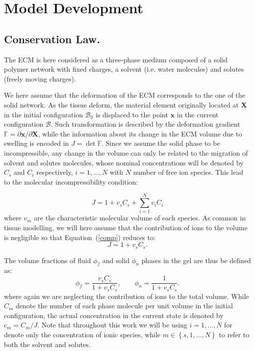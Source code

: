 \documentclass[runningheads]{llncs}
\newcommand{\F}{\ensuremath{\mathbb{F}}}
\begin{document}
\section{Model Development}
\subsection{Conservation Law.}

The ECM is here considered as a three-phase medium composed of a solid polymer network with fixed charges, a solvent (i.e. water molecules) and solutes (freely moving charges).

We here assume that the deformation of the ECM corresponds to the one of the solid network. As the tissue deform, the material element originally located at $\mathbf{X}$ in the initial configuration $\mathcal{B}_0$ is displaced to the point $\mathbf{x}$ in the current configuration $\mathcal{B}$. Such transformation is described by the deformation gradient $\F= \partial \mathbf{x}/\partial \mathbf{X}$, while the information about its change in the ECM volume due to swelling is encoded in $J= \det \F$. Since we assume the solid phase to be incompressible, any change in the volume can only be related to the migration of solvent and solutes molecules, whose nominal concentrations will be denoted by $C_s$ and $C_i$ respectively, $i=1,\ldots,N$ with $N$ number of free ion species. This lead to the molecular incompressibility condition:

\begin{equation}
 J= 1 + v_s C_s +\sum\limits_{i=1}^{N} v_i C_i
 \label{comp}
\end{equation}
where $v_m$ are the characteristic molecular volume of each species. As common in tissue modelling, we will here assume that the contribution of ions to the volume is negligible so that Equation~(\ref{comp}) reduces to:
\begin{equation}
J=1+v_s C_s.
\end{equation} 

The volume fractions of fluid $\phi_f$ and solid $\phi_n$ phases in the gel are thus be defined as:
\begin{equation}
\phi_f = \frac{v_sC_s}{1+v_sC_s}, \qquad \phi_n = \frac{1}{1+v_sC_s}.
\end{equation}
where again we are neglecting the contribution of ions to the total volume.
While $C_m$ denote the number of each phase molecule per unit volume in the initial configuration, the actual concentration in the current state is denoted by $c_m=C_m/J$. Note that throughout this work we will be using $i=1,\ldots,N$ for denote only the concentration of ionic species, while $m\in\left\{s,1,\ldots,N\right\}$ to refer to both the solvent and solutes.
\end{document}
